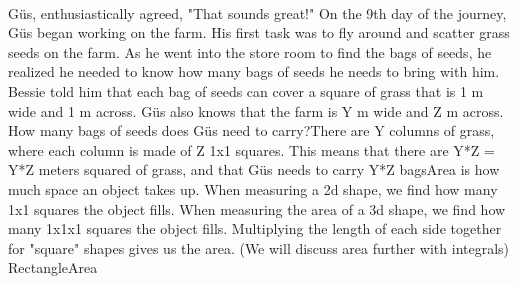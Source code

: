 \documentclass[a4paper,11pt ]{book}
\begin{document}
 \paragraph{} Güs, enthusiastically agreed, "That sounds great!"
{On the 9th day of the journey, Güs began working on the farm. His first task was to fly around and scatter grass seeds on the farm. As he went into the store room to find the bags of seeds, he realized he needed to know how many bags of seeds he needs to bring with him. Bessie told him that each bag of seeds can cover a square of grass that is 1 m wide and 1 m across. Güs also knows that the farm is Y m wide and Z m across. How many bags of seeds does Güs need to carry?}{There are Y columns of grass, where each column is made of Z 1x1 squares. This means that there are Y*Z = Y*Z meters squared of grass, and that Güs needs to carry Y*Z bags}{Area is how much space an object takes up. When measuring a 2d shape, we find how many 1x1 squares the object fills. When measuring the area of a 3d shape, we find how many 1x1x1 squares the object fills. Multiplying the length of each side together for "square" shapes gives us the area. (We will discuss area further with integrals)
}{RectangleArea}
\end{document}
